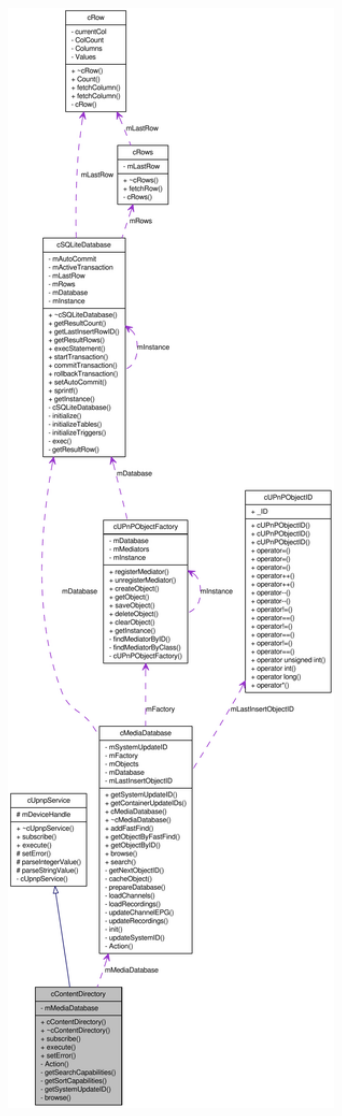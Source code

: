 \begin{figure}[H]
\begin{center}
\leavevmode
\includegraphics[width=400pt]{classcContentDirectory__coll__graph}
\end{center}
\end{figure}
